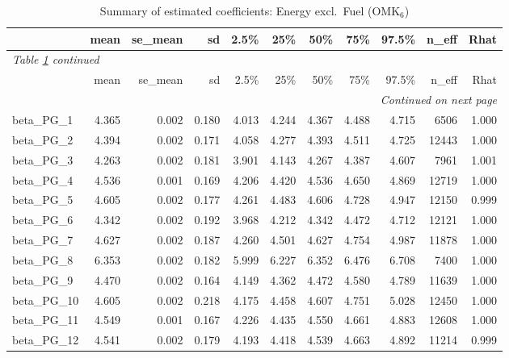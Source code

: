 \documentclass[12pt]{article}
\begin{document}
\newpage


\begingroup
\footnotesize
\setlength{\tabcolsep}{3pt}
\begin{longtable}{lrrrrrrrrrr}
\caption{Summary of estimated coefficients: Energy excl.\ Fuel (OMK$_\text{6}$)}
\label{tab:coef_summary_omk6} \\
\toprule
 & mean & se\_mean & sd & 2.5\% & 25\% & 50\% & 75\% & 97.5\% & n\_eff & Rhat \\
\midrule
\endfirsthead
\multicolumn{11}{l}{\textit{Table \ref{tab:coef_summary_omk6} continued}} \\
\toprule
 & mean & se\_mean & sd & 2.5\% & 25\% & 50\% & 75\% & 97.5\% & n\_eff & Rhat \\
\midrule
\endhead
\midrule
\multicolumn{11}{r}{\textit{Continued on next page}} \\
\endfoot
\bottomrule
\endlastfoot
beta\_PG\_1   &  4.365 & 0.002 & 0.180 &  4.013 &  4.244 &  4.367 &  4.488 &  4.715 &  6506 & 1.000 \\
beta\_PG\_2   &  4.394 & 0.002 & 0.171 &  4.058 &  4.277 &  4.393 &  4.511 &  4.725 & 12443 & 1.000 \\
beta\_PG\_3   &  4.263 & 0.002 & 0.181 &  3.901 &  4.143 &  4.267 &  4.387 &  4.607 &  7961 & 1.001 \\
beta\_PG\_4   &  4.536 & 0.001 & 0.169 &  4.206 &  4.420 &  4.536 &  4.650 &  4.869 & 12719 & 1.000 \\
beta\_PG\_5   &  4.605 & 0.002 & 0.177 &  4.261 &  4.483 &  4.606 &  4.728 &  4.947 & 12150 & 0.999 \\
beta\_PG\_6   &  4.342 & 0.002 & 0.192 &  3.968 &  4.212 &  4.342 &  4.472 &  4.712 & 12121 & 1.000 \\
beta\_PG\_7   &  4.627 & 0.002 & 0.187 &  4.260 &  4.501 &  4.627 &  4.754 &  4.987 & 11878 & 1.000 \\
beta\_PG\_8   &  6.353 & 0.002 & 0.182 &  5.999 &  6.227 &  6.352 &  6.476 &  6.708 &  7400 & 1.000 \\
beta\_PG\_9   &  4.470 & 0.002 & 0.164 &  4.149 &  4.362 &  4.472 &  4.580 &  4.789 & 11639 & 1.000 \\
beta\_PG\_10  &  4.605 & 0.002 & 0.218 &  4.175 &  4.458 &  4.607 &  4.751 &  5.028 & 12450 & 1.000 \\
beta\_PG\_11  &  4.549 & 0.001 & 0.167 &  4.226 &  4.435 &  4.550 &  4.661 &  4.883 & 12608 & 1.000 \\
beta\_PG\_12  &  4.541 & 0.002 & 0.179 &  4.193 &  4.418 &  4.539 &  4.663 &  4.892 & 11214 & 0.999 \\

\end{longtable}
\end{document}
